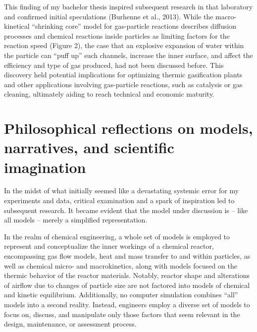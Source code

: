 \documentclass[authordate, anecdote]{jote-new-article}
\begin{document}
	This finding of my bachelor thesis inspired subsequent research in that laboratory and confirmed initial speculations (Burhenne et al., 2013). While the macro-kinetical “shrinking core” model for gas-particle reactions describes diffusion processes and chemical reactions inside particles as limiting factors for the reaction speed (Figure 2), the case that an explosive expansion of water within the particle can “puff up” such channels, increase the inner surface, and affect the efficiency and type of gas produced, had not been discussed before. This discovery held potential implications for optimizing thermic gasification plants and other applications involving gas-particle reactions, such as catalysis or gas cleaning, ultimately aiding to reach technical and economic maturity.



	\section{Philosophical reflections on models, narratives, and scientific imagination}



	In the midst of what initially seemed like a devastating systemic error for my experiments and data, critical examination and a spark of inspiration led to subsequent research. It became evident that the model under discussion is -- like all models -- merely a simplified representation.



	In the realm of chemical engineering, a whole set of models is employed to represent and conceptualize the inner workings of a chemical reactor, encompassing gas flow models, heat and mass transfer to and within particles, as well as chemical micro- and macrokinetics, along with models focused on the thermic behavior of the reactor materials. Notably, reactor shape and alterations of airflow due to changes of particle size are not factored into models of chemical and kinetic equilibrium. Additionally, no computer simulation combines “all” models into a second reality. Instead, engineers employ a diverse set of models to focus on, discuss, and manipulate only those factors that seem relevant in the design, maintenance, or assessment process.
\end{document}

